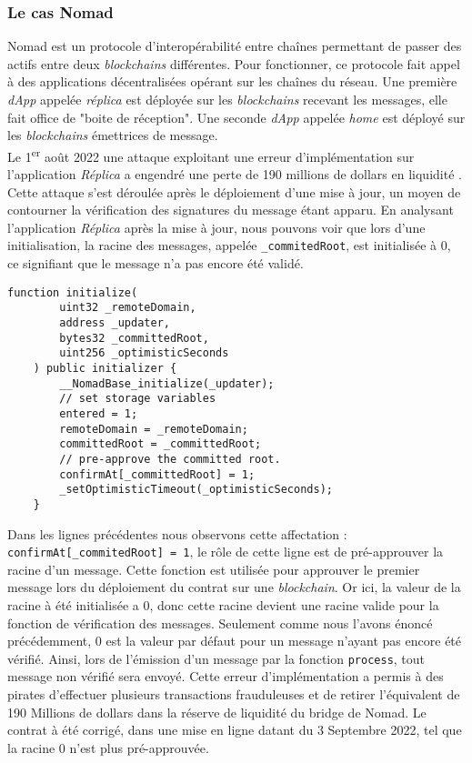 \subsubsection{Le cas Nomad}
Nomad est un protocole d'interopérabilité entre chaînes permettant de passer des \gls{actif}s entre deux \textit{\gls{blockchain}s} différentes. 
Pour fonctionner, ce protocole fait appel à des applications décentralisées opérant sur les chaînes du réseau. 
Une première \textit{\gls{dApp}} appelée \textit{réplica} est déployée sur les \textit{\gls{blockchain}s} recevant les messages, elle fait office de "boite de réception". 
Une seconde \textit{\gls{dApp}} appelée \textit{home} est déployé sur les \textit{\gls{blockchain}s} émettrices de message. \\
Le 1\textsuperscript{er} août 2022 une attaque exploitant une erreur d'implémentation sur l'application \textit{Réplica} a engendré une perte de 190 millions de dollars en liquidité \cite{NomadMedium} \cite{NomadRekt}.
Cette attaque s'est déroulée après le déploiement d'une mise à jour, un moyen de contourner la vérification des signatures du message étant apparu. 
En analysant l'application \textit{Réplica} après la mise à jour, nous pouvons voir que lors d'une initialisation, la racine des messages, appelée \texttt{\_commitedRoot}, est initialisée à $0$, ce signifiant que le message n'a pas encore été validé. 
\begin{lstlisting}[caption={Fonction \textit{initialize} de \textit{Réplica} contenant une erreur \cite{NomadGitError}}]
    function initialize(
        uint32 _remoteDomain,
        address _updater,
        bytes32 _committedRoot,
        uint256 _optimisticSeconds
    ) public initializer {
        __NomadBase_initialize(_updater);
        // set storage variables
        entered = 1;
        remoteDomain = _remoteDomain;
        committedRoot = _committedRoot;
        // pre-approve the committed root.
        confirmAt[_committedRoot] = 1;
        _setOptimisticTimeout(_optimisticSeconds);
    }
\end{lstlisting}

Dans les lignes précédentes nous observons cette affectation : \texttt{confirmAt[\_commitedRoot] = 1}, le rôle de cette ligne est de pré-approuver la racine d'un message. 
Cette fonction est utilisée pour approuver le premier message lors du déploiement du contrat sur une \textit{\gls{blockchain}}. 
Or ici, la valeur de la racine à été initialisée a $0$, donc cette racine devient une racine valide pour la fonction de vérification des messages. 
Seulement comme nous l'avons énoncé précédemment, $0$ est la valeur par défaut pour un message n'ayant pas encore été vérifié. 
Ainsi, lors de l'émission d'un message par la fonction \texttt{process}, tout message non vérifié sera envoyé. 
Cette erreur d'implémentation a permis à des pirates d'effectuer plusieurs transactions frauduleuses et de retirer l'équivalent de 190 Millions de dollars dans la réserve de liquidité du bridge de Nomad. 
Le contrat à été corrigé, dans une mise en ligne datant du 3 Septembre 2022, tel que la racine $0$ n'est plus pré-approuvée. 

